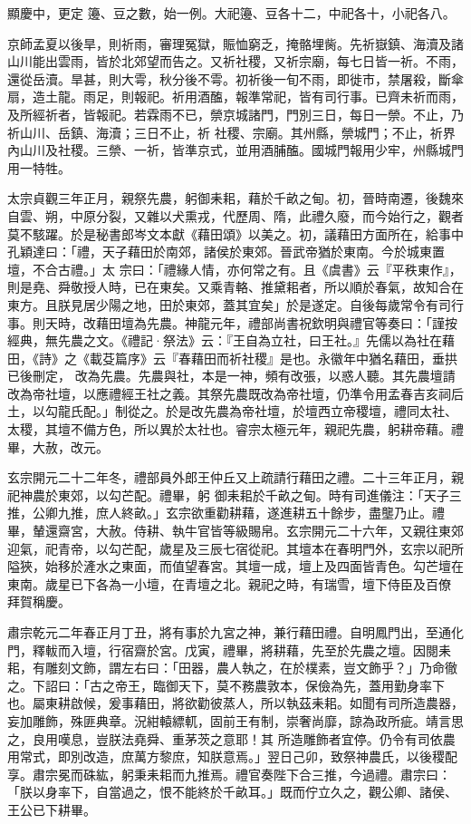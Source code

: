 \begin{pinyinscope}
 顯慶中，更定
 籩、豆之數，始一例。大祀籩、豆各十二，中祀各十，小祀各八。



 京師孟夏以後旱，則祈雨，審理冤獄，賑恤窮乏，掩骼埋胔。先祈嶽鎮、海瀆及諸山川能出雲雨，皆於北郊望而告之。又祈社稷，又祈宗廟，每七日皆一祈。不雨，還從岳瀆。旱甚，則大雩，秋分後不雩。初祈後一旬不雨，即徙市，禁屠殺，斷傘扇，造土龍。雨足，則報祀。祈用酒醢，報準常祀，皆有司行事。已齊未祈而雨，及所經祈者，皆報祀。若霖雨不已，禜京城諸門，門別三日，每日一禜。不止，乃祈山川、岳鎮、海瀆；三日不止，祈
 社稷、宗廟。其州縣，禜城門；不止，祈界內山川及社稷。三禜、一祈，皆準京式，並用酒脯醢。國城門報用少牢，州縣城門用一特牲。



 太宗貞觀三年正月，親祭先農，躬御耒耜，藉於千畝之甸。初，晉時南遷，後魏來自雲、朔，中原分裂，又雜以犬熏戎，代歷周、隋，此禮久廢，而今始行之，觀者莫不駭躍。於是秘書郎岑文本獻《藉田頌》以美之。初，議藉田方面所在，給事中孔穎達曰：「禮，天子藉田於南郊，諸侯於東郊。晉武帝猶於東南。今於城東置壇，不合古禮。」太
 宗曰：「禮緣人情，亦何常之有。且《虞書》云『平秩東作』，則是堯、舜敬授人時，已在東矣。又乘青輅、推黛耜者，所以順於春氣，故知合在東方。且朕見居少陽之地，田於東郊，蓋其宜矣」於是遂定。自後每歲常令有司行事。則天時，改藉田壇為先農。神龍元年，禮部尚書祝欽明與禮官等奏曰：「謹按經典，無先農之文。《禮記·祭法》云：『王自為立社，曰王社。』先儒以為社在藉田，《詩》之《載芟篇序》云『春藉田而祈社稷』是也。永徽年中猶名藉田，垂拱已後刪定，
 改為先農。先農與社，本是一神，頻有改張，以惑人聽。其先農壇請改為帝社壇，以應禮經王社之義。其祭先農既改為帝社壇，仍準令用孟春吉亥祠后土，以勾龍氏配。」制從之。於是改先農為帝社壇，於壇西立帝稷壇，禮同太社、太稷，其壇不備方色，所以異於太社也。睿宗太極元年，親祀先農，躬耕帝藉。禮畢，大赦，改元。



 玄宗開元二十二年冬，禮部員外郎王仲丘又上疏請行藉田之禮。二十三年正月，親祀神農於東郊，以勾芒配。禮畢，躬
 御耒耜於千畝之甸。時有司進儀注：「天子三推，公卿九推，庶人終畝。」玄宗欲重勸耕藉，遂進耕五十餘步，盡壟乃止。禮畢，輦還齋宮，大赦。侍耕、執牛官皆等級賜帛。玄宗開元二十六年，又親往東郊迎氣，祀青帝，以勾芒配，歲星及三辰七宿從祀。其壇本在春明門外，玄宗以祀所隘狹，始移於滻水之東面，而值望春宮。其壇一成，壇上及四面皆青色。勾芒壇在東南。歲星已下各為一小壇，在青壇之北。親祀之時，有瑞雪，壇下侍臣及百僚
 拜賀稱慶。



 肅宗乾元二年春正月丁丑，將有事於九宮之神，兼行藉田禮。自明鳳門出，至通化門，釋軷而入壇，行宿齋於宮。戊寅，禮畢，將耕藉，先至於先農之壇。因閱耒耜，有雕刻文飾，謂左右曰：「田器，農人執之，在於樸素，豈文飾乎？」乃命徹之。下詔曰：「古之帝王，臨御天下，莫不務農敦本，保儉為先，蓋用勤身率下也。屬東耕啟候，爰事藉田，將欲勸彼蒸人，所以執茲耒耜。如聞有司所造農器，妄加雕飾，殊匪典章。況紺轅縹軏，固前王有制，崇奢尚靡，諒為政所疵。靖言思之，良用嘆息，豈朕法堯舜、重茅茨之意耶！其
 所造雕飾者宜停。仍令有司依農用常式，即別改造，庶萬方黎庶，知朕意焉。」翌日己卯，致祭神農氏，以後稷配享。肅宗冕而硃紘，躬秉耒耜而九推焉。禮官奏陛下合三推，今過禮。肅宗曰：「朕以身率下，自當過之，恨不能終於千畝耳。」既而佇立久之，觀公卿、諸侯、王公已下耕畢。




\end{pinyinscope}
